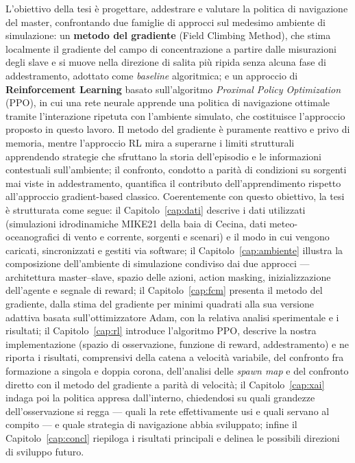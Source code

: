L'obiettivo della tesi \`e progettare, addestrare e valutare la politica di navigazione
del master, confrontando due famiglie di approcci sul medesimo ambiente di simulazione:
un \textbf{metodo del gradiente} (Field Climbing Method), che stima localmente il
gradiente del campo di concentrazione a partire dalle misurazioni degli slave e si muove
nella direzione di salita pi\`u ripida senza alcuna fase di addestramento, adottato come
\emph{baseline} algoritmica; e un approccio di \textbf{Reinforcement Learning} basato
sull'algoritmo \emph{Proximal Policy Optimization} (PPO), in cui una rete neurale
apprende una politica di navigazione ottimale tramite l'interazione ripetuta con
l'ambiente simulato, che costituisce l'approccio proposto in questo lavoro. Il metodo del
gradiente \`e puramente reattivo e privo di memoria, mentre l'approccio RL mira a
superarne i limiti strutturali apprendendo strategie che sfruttano la storia
dell'episodio e le informazioni contestuali sull'ambiente; il confronto, condotto a
parit\`a di condizioni su sorgenti mai viste in addestramento, quantifica il contributo
dell'apprendimento rispetto all'approccio gradient-based classico. Coerentemente con
questo obiettivo, la tesi \`e strutturata come segue: il Capitolo~\ref{cap:dati} descrive
i dati utilizzati (simulazioni idrodinamiche MIKE21 della baia di Cecina, dati
meteo-oceanografici di vento e corrente, sorgenti e scenari) e il modo in cui vengono
caricati, sincronizzati e gestiti via software; il Capitolo~\ref{cap:ambiente} illustra la
composizione dell'ambiente di simulazione condiviso dai due approcci --- architettura
master--slave, spazio delle azioni, action masking, inizializzazione dell'agente e segnale
di reward; il Capitolo~\ref{cap:fcm}
presenta il metodo del gradiente,
dalla stima del gradiente per minimi quadrati alla sua versione adattiva basata
sull'ottimizzatore Adam, con la relativa analisi sperimentale e i risultati; il
Capitolo~\ref{cap:rl} introduce l'algoritmo PPO, descrive la nostra implementazione
(spazio di osservazione, funzione di reward, addestramento) e ne riporta i risultati,
comprensivi della catena a velocit\`a variabile, del confronto fra formazione a singola e
doppia corona, dell'analisi delle \emph{spawn map} e del confronto diretto con il metodo
del gradiente a parit\`a di velocit\`a; il Capitolo~\ref{cap:xai} indaga poi la politica
appresa dall'interno, chiedendosi su quali grandezze dell'osservazione si regga --- quali
la rete effettivamente usi e quali servano al compito --- e quale strategia di navigazione
abbia sviluppato; infine il Capitolo~\ref{cap:concl} riepiloga i risultati principali e
delinea le possibili direzioni di sviluppo futuro.
